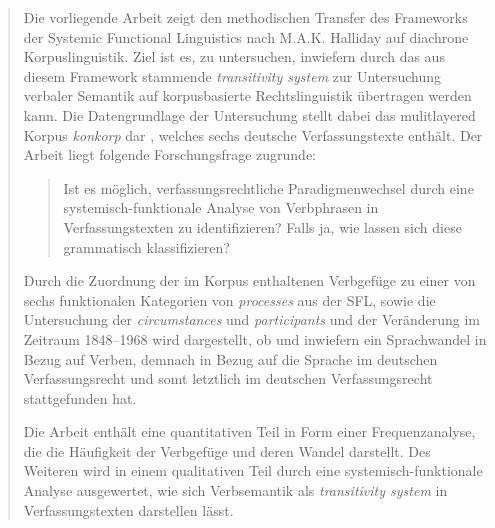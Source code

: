 \setcounter{page}{1}
{}
\begin{abstract}
 Die vorliegende Arbeit zeigt den methodischen Transfer des Frameworks der Systemic Functional Linguistics nach M.A.K. Halliday auf diachrone Korpuslinguistik. Ziel ist es, zu untersuchen, inwiefern durch das aus diesem Framework stammende \textit{transitivity system} zur Untersuchung verbaler Semantik auf korpusbasierte Rechtslinguistik übertragen werden kann. Die Datengrundlage der Untersuchung stellt dabei das mulitlayered Korpus \textit{konkorp} dar \citep{Thurau2025}, welches sechs deutsche Verfassungstexte enthält.
 Der Arbeit liegt folgende Forschungsfrage zugrunde:

 \begin{quote}
  Ist es möglich, verfassungsrechtliche Paradigmenwechsel durch eine systemisch-funktionale Analyse von Verbphrasen in Verfassungstexten zu identifizieren? Falls ja, wie lassen sich diese grammatisch klassifizieren?
 \end{quote}


 Durch die Zuordnung der im Korpus enthaltenen Verbgefüge zu einer von sechs funktionalen Kategorien von \textit{processes} aus der SFL, sowie die Untersuchung der \textit{circumstances} und \textit{participants} und der Veränderung im Zeitraum 1848--1968 wird dargestellt, ob und inwiefern ein Sprachwandel in Bezug auf Verben, demnach in Bezug auf die Sprache im deutschen Verfassungsrecht und somt letztlich im deutschen Verfassungsrecht stattgefunden hat.

 Die Arbeit enthält eine quantitativen Teil in Form einer Frequenzanalyse, die die Häufigkeit der Verbgefüge und deren Wandel darstellt. Des Weiteren wird in einem qualitativen Teil durch eine systemisch-funktionale Analyse ausgewertet, wie sich Verbsemantik als \textit{transitivity system} in Verfassungstexten darstellen lässt.
\end{abstract}
